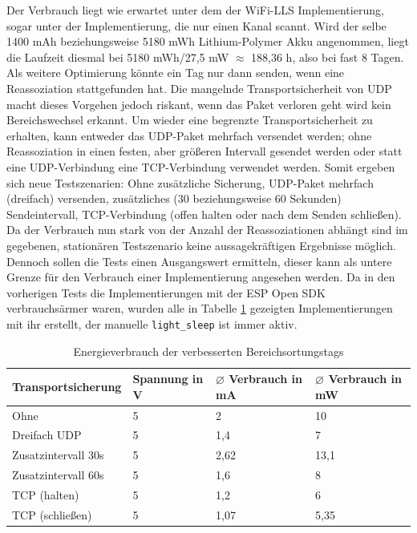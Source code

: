 Der Verbrauch liegt wie erwartet unter dem der WiFi-LLS Implementierung, sogar unter der Implementierung, die nur einen Kanal scannt.
Wird der selbe 1400 mAh beziehungsweise 5180 mWh Lithium-Polymer Akku angenommen, liegt die Laufzeit diesmal  bei 5180 mWh/27,5 mW $\approx$ 188,36 h, also bei fast 8 Tagen. \\
Als weitere Optimierung könnte ein Tag nur dann senden, wenn eine Reassoziation stattgefunden hat.
Die mangelnde Transportsicherheit von UDP macht dieses Vorgehen jedoch riskant, wenn das Paket verloren geht wird kein Bereichswechsel erkannt.
Um wieder eine begrenzte Transportsicherheit zu erhalten, kann entweder das UDP-Paket mehrfach versendet werden; ohne Reassoziation in einen festen, aber größeren Intervall gesendet werden oder statt eine UDP-Verbindung eine TCP-Verbindung verwendet werden.
Somit ergeben sich neue Testszenarien: Ohne zusätzliche Sicherung, UDP-Paket mehrfach (dreifach) versenden, zusätzliches (30 beziehungsweise 60 Sekunden) Sendeintervall, TCP-Verbindung (offen halten oder nach dem Senden schließen). \\
Da der Verbrauch nun stark von der Anzahl der Reassoziationen abhängt sind im gegebenen, stationären Testszenario keine aussagekräftigen Ergebnisse möglich.
Dennoch sollen die Tests einen Ausgangswert ermitteln, dieser kann als untere Grenze für den Verbrauch einer Implementierung angesehen werden.
Da in den vorherigen Tests die Implementierungen mit der ESP Open SDK verbrauchsärmer waren, wurden alle in Tabelle \ref{table:naiveoptconsumption} gezeigten Implementierungen mit ihr erstellt, der manuelle \texttt{light\_sleep} ist immer aktiv.

\begin{table}[h]
	\centering
	\caption{Energieverbrauch der verbesserten Bereichsortungstags}
	\label{table:naiveoptconsumption}
	\begin{tabular}{p{3.5cm}|p{1.7cm}|p{2.5cm}|p{2.5cm}}
		Transportsicherung & Spannung in V & $\varnothing$ Verbrauch in mA & $\varnothing$ Verbrauch in mW \\
		\hline
		Ohne & 5 & 2 & 10 \\
		Dreifach UDP & 5 & 1,4 & 7 \\
		Zusatzintervall 30s & 5 & 2,62 & 13,1 \\
		Zusatzintervall 60s & 5 & 1,6 & 8 \\
		TCP (halten) & 5 & 1,2 & 6 \\
		TCP (schließen) & 5 & 1,07 & 5,35 \\
	\end{tabular}
\end{table}

